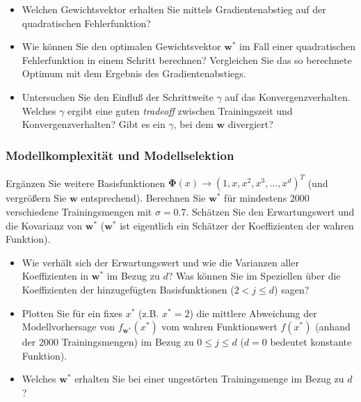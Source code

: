 \documentclass[a4]{article}
\begin{document}
\vspace{2mm}
\begin{itemize}
\item Welchen Gewichtsvektor erhalten Sie mittels Gradientenabstieg auf der quadratischen Fehlerfunktion?
\item Wie können Sie den optimalen Gewichtsvektor ${\mathbf w}^*$ im Fall einer quadratischen Fehlerfunktion in einem Schritt berechnen? Vergleichen Sie das so berechnete Optimum mit dem Ergebnis des Gradientenabstiegs.
\item Untersuchen Sie den Einfluß der Schrittweite $\gamma$ auf das
Konvergenzverhalten. Welches $\gamma$ ergibt eine guten \emph{tradeoff}
zwischen Trainingszeit und Konvergenzverhalten? Gibt es ein $\gamma$,
bei dem ${\mathbf w}$ divergiert?
\end{itemize}

\subsubsection{Modellkomplexität und Modellselektion}
Ergänzen Sie weitere Basisfunktionen ${\mathbf \Phi}(x) \rightarrow (1,x,x^2,x^3,...,x^d)^T$ (und vergrö{\ss}ern Sie ${\mathbf w}$ entsprechend). Berechnen Sie ${\mathbf w}^*$ für mindestens 2000 verschiedene Trainingsmengen mit $\sigma = 0.7$. Schätzen Sie den Erwartungswert und die Kovarianz von ${\mathbf w}^*$ (${\mathbf w^*}$ ist eigentlich ein Schätzer der Koeffizienten der wahren Funktion). 

\vspace{2mm}
\begin{itemize}
\item Wie verhält sich der Erwartungswert und wie die Varianzen aller Koeffizienten in ${\mathbf w}^*$ im Bezug zu $d$? Was können Sie im Speziellen über die Koeffizienten der hinzugefügten Basisfunktionen ($2< j \leq d$) sagen?
\item Plotten Sie für ein fixes $x^*$ (z.B. $x^* = 2$) die mittlere Abweichung der Modellvorhersage von $f_{\mathbf w^*}(x^*)$ vom wahren Funktionswert $f(x^*)$ (anhand der 2000 Trainingsmengen) im Bezug zu $0 \leq j \leq d$ ($d = 0$ bedeutet konstante Funktion).  
\item Welches ${\mathbf w^*}$ erhalten Sie bei einer ungestörten Trainingsmenge im Bezug zu $d$?
\end{itemize}
\end{document}

